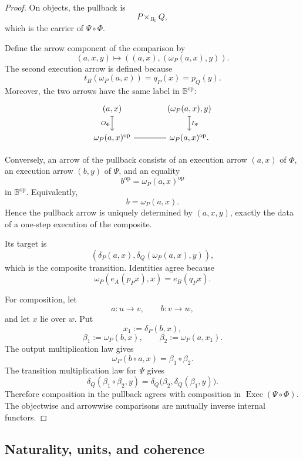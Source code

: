 \begin{proof}
On objects, the pullback is
\[
    P\times_{B_0}Q,
\]
which is the carrier of \(\Psi\circ\Phi\).

Define the arrow component of the comparison by
\[
    (a,x,y)
    \longmapsto
    \left(
        (a,x),
        (\omega_P(a,x),y)
    \right).
\]
The second execution arrow is defined because
\[
    t_B(\omega_P(a,x))
    =
    q_P(x)
    =
    p_Q(y).
\]
Moreover, the two arrows have the same label in
\(\mathbb B^{\mathrm{op}}\):
\[
\begin{tikzcd}[column sep=large]
    (a,x)
        \arrow[d, mapsto, "O_\Phi"']
    &
    (\omega_P(a,x),y)
        \arrow[d, mapsto, "I_\Psi"]
    \\
    \omega_P(a,x)^{\mathrm{op}}
        \arrow[r, equal]
    &
    \omega_P(a,x)^{\mathrm{op}}.
\end{tikzcd}
\]

Conversely, an arrow of the pullback consists of an execution arrow
\((a,x)\) of \(\Phi\), an execution arrow \((b,y)\) of \(\Psi\), and an
equality
\[
    b^{\mathrm{op}}
    =
    \omega_P(a,x)^{\mathrm{op}}
\]
in \(\mathbb B^{\mathrm{op}}\). Equivalently,
\[
    b=\omega_P(a,x).
\]
Hence the pullback arrow is uniquely determined by \((a,x,y)\), exactly the
data of a one-step execution of the composite.

Its target is
\[
    \left(
        \delta_P(a,x),
        \delta_Q(\omega_P(a,x),y)
    \right),
\]
which is the composite transition. Identities agree because
\[
    \omega_P(e_A(p_Px),x)=e_B(q_Px).
\]

For composition, let
\[
    a:u\to v,
    \qquad
    b:v\to w,
\]
and let \(x\) lie over \(w\). Put
\[
    x_1:=\delta_P(b,x),
\]
\[
    \beta_1:=\omega_P(b,x),
    \qquad
    \beta_2:=\omega_P(a,x_1).
\]
The output multiplication law gives
\[
    \omega_P(b\circ a,x)
    =
    \beta_1\circ\beta_2.
\]
The transition multiplication law for \(\Psi\) gives
\[
    \delta_Q(\beta_1\circ\beta_2,y)
    =
    \delta_Q\bigl(\beta_2,\delta_Q(\beta_1,y)\bigr).
\]
Therefore composition in the pullback agrees with composition in
\(\operatorname{Exec}(\Psi\circ\Phi)\). The objectwise and arrowwise
comparisons are mutually inverse internal functors.
\end{proof}

\subsection{Naturality, units, and coherence}
\label{subsec:naturality-units-coherence}

